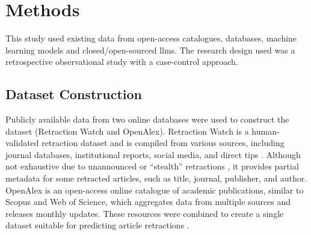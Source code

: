 \documentclass[pdflatex,sn-mathphys-num]{sn-jnl}%
\begin{document}


\section{Methods}

This study used existing data from open-access catalogues, databases, machine learning models and closed/open-sourced \glspl*{llm}.  The research design used was a retrospective observational study with a case-control approach. 

\subsection{Dataset Construction}\label{sec:datagen}

Publicly available data from two online databases were used to construct the dataset (Retraction Watch and OpenAlex). Retraction Watch is a human-validated retraction dataset and is compiled from various sources, including journal databases, institutional reports, social media, and direct tips \cite{retraction_watch_retraction_2024, retraction_watch_retraction_2024-1}. Although not exhaustive due to unannounced or ``stealth'' retractions \cite{teixeira_da_silva_silent_2016}, it provides partial metadata for some retracted articles, such as title, journal, publisher, and author. OpenAlex is an open-access online catalogue of academic publications, similar to Scopus and Web of Science, which aggregates data from multiple sources and releases monthly updates. These resources were combined to create a single dataset suitable for predicting article retractions \cite{priem_openalex_2022}.
\end{document}
